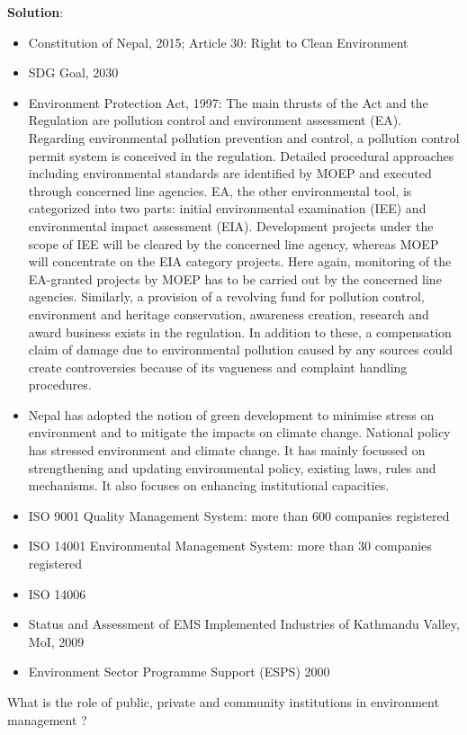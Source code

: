 \documentclass[
  openany]{book}
\newcommand{\question}{\item}
\newenvironment{solution}{ {\bfseries Solution}:}{}
\begin{document}
\begin{questions}
\begin{solution}
\begin{itemize}
\item Constitution of Nepal, 2015; Article 30: Right to Clean Environment
\item SDG Goal, 2030
\item Environment Protection Act, 1997: The main thrusts of the Act and the Regulation are pollution control and environment assessment (EA). Regarding environmental pollution prevention and control, a pollution control permit system is conceived in the regulation. Detailed procedural approaches including environmental standards are identified by MOEP and executed through concerned line agencies. EA, the other environmental tool, is categorized into two parts: initial environmental examination (IEE) and environmental impact assessment (EIA). Development projects under the scope of IEE will be cleared by the concerned line agency, whereas MOEP will concentrate on the EIA category projects. Here again, monitoring of the EA-granted projects by MOEP has to be carried out by the concerned line agencies. Similarly, a provision of a revolving fund for pollution control, environment and heritage conservation, awareness creation, research and award business exists in the regulation. In addition to these, a compensation claim of damage due to environmental pollution caused by any sources could create controversies because of its vagueness and complaint handling procedures.
\item Nepal has adopted the notion of green development to minimise stress on environment and to mitigate the impacts on climate change. National policy has stressed environment and climate change. It has mainly focussed on strengthening and updating environmental policy, existing laws, rules and mechanisms. It also focuses on enhancing institutional capacities.
\item ISO 9001 Quality Management System: more than 600 companies registered
\item ISO 14001 Environmental Management System: more than 30 companies registered
\item ISO 14006
\item Status and Assessment of EMS Implemented Industries of Kathmandu Valley, MoI, 2009 
\item Environment Sector Programme Support (ESPS) 2000
\end{itemize}

\end{solution}

\question What is the role of public, private and community institutions in environment management ?


\end{questions}
\end{document}
